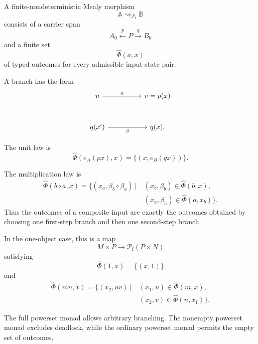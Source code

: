\begin{example}
\label{example:nondeterministic-mealy-morphisms}
    A finite-nondeterministic Mealy morphism
    \[
        \mathbb A
        \rightsquigarrow_{\mathcal P_{\mathrm f}}
        \mathbb B
    \]
    consists of a carrier span
    \[
        A_0\xleftarrow{p}P\xrightarrow{q}B_0
    \]
    and a finite set
    \[
        \widehat\Phi(a,x)
    \]
    of typed outcomes for every admissible input-state pair.

    A branch has the form
    \[
        \begin{tikzcd}[column sep=huge, row sep=large]
                u
                    \arrow[r, "a"]
            &
                v=p(x)
            \\
                q(x')
                    \arrow[r, "\beta"']
            &
                q(x).
        \end{tikzcd}
    \]

    The unit law is
    \[
        \widehat\Phi(e_A(px),x)
        =
        \bigl\{
            (x,e_B(qx))
        \bigr\}.
    \]

    The multiplication law is
    \[
    \begin{aligned}
        \widehat\Phi(b\circ a,x)
        =
        \bigl\{
            (x_a,\beta_b\circ\beta_a)
            \ \big|\
            &(x_b,\beta_b)\in\widehat\Phi(b,x),
            \\
            &(x_a,\beta_a)\in\widehat\Phi(a,x_b)
        \bigr\}.
    \end{aligned}
    \]
    Thus the outcomes of a composite input are exactly the outcomes obtained
    by choosing one first-step branch and then one second-step branch.

    In the one-object case, this is a map
    \[
        M\times P
        \longrightarrow
        \mathcal P_{\mathrm f}(P\times N)
    \]
    satisfying
    \[
        \widehat\Phi(1,x)
        =
        \{(x,1)\}
    \]
    and
    \[
    \begin{aligned}
        \widehat\Phi(mn,x)
        =
        \bigl\{
            (x_2,uv)
            \ \big|\
            &(x_1,u)\in\widehat\Phi(m,x),
            \\
            &(x_2,v)\in\widehat\Phi(n,x_1)
        \bigr\}.
    \end{aligned}
    \]
\end{example}

The full powerset monad allows arbitrary branching. The nonempty powerset
monad excludes deadlock, while the ordinary powerset monad permits the empty
set of outcomes.

